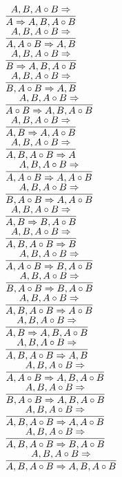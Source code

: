 \documentclass[11pt]{article}
\begin{document}
\begin{center}
\\$\infer{A\Rightarrow A, B, A\circ B}{A, B, A\circ B\Rightarrow }$
\bigskip
\\$\infer{A, A\circ B\Rightarrow A, B}{A, B, A\circ B\Rightarrow }$
\bigskip
\\$\infer{B\Rightarrow A, B, A\circ B}{A, B, A\circ B\Rightarrow }$
\bigskip
\\$\infer{B, A\circ B\Rightarrow A, B}{A, B, A\circ B\Rightarrow }$
\bigskip
\\$\infer{A\circ B\Rightarrow A, B, A\circ B}{A, B, A\circ B\Rightarrow }$
\bigskip
\\$\infer{A, B\Rightarrow A, A\circ B}{A, B, A\circ B\Rightarrow }$
\bigskip
\\$\infer{A, B, A\circ B\Rightarrow A}{A, B, A\circ B\Rightarrow }$
\bigskip
\\$\infer{A, A\circ B\Rightarrow A, A\circ B}{A, B, A\circ B\Rightarrow }$
\bigskip
\\$\infer{B, A\circ B\Rightarrow A, A\circ B}{A, B, A\circ B\Rightarrow }$
\bigskip
\\$\infer{A, B\Rightarrow B, A\circ B}{A, B, A\circ B\Rightarrow }$
\bigskip
\\$\infer{A, B, A\circ B\Rightarrow B}{A, B, A\circ B\Rightarrow }$
\bigskip
\\$\infer{A, A\circ B\Rightarrow B, A\circ B}{A, B, A\circ B\Rightarrow }$
\bigskip
\\$\infer{B, A\circ B\Rightarrow B, A\circ B}{A, B, A\circ B\Rightarrow }$
\bigskip
\\$\infer{A, B, A\circ B\Rightarrow A\circ B}{A, B, A\circ B\Rightarrow }$
\bigskip
\\$\infer{A, B\Rightarrow A, B, A\circ B}{A, B, A\circ B\Rightarrow }$
\bigskip
\\$\infer{A, B, A\circ B\Rightarrow A, B}{A, B, A\circ B\Rightarrow }$
\bigskip
\\$\infer{A, A\circ B\Rightarrow A, B, A\circ B}{A, B, A\circ B\Rightarrow }$
\bigskip
\\$\infer{B, A\circ B\Rightarrow A, B, A\circ B}{A, B, A\circ B\Rightarrow }$
\bigskip
\\$\infer{A, B, A\circ B\Rightarrow A, A\circ B}{A, B, A\circ B\Rightarrow }$
\bigskip
\\$\infer{A, B, A\circ B\Rightarrow B, A\circ B}{A, B, A\circ B\Rightarrow }$
\bigskip
\\$\infer{A, B, A\circ B\Rightarrow A, B, A\circ B}{A, B, A\circ B\Rightarrow }$
\bigskip
\\
\end{center}
\end{document}
